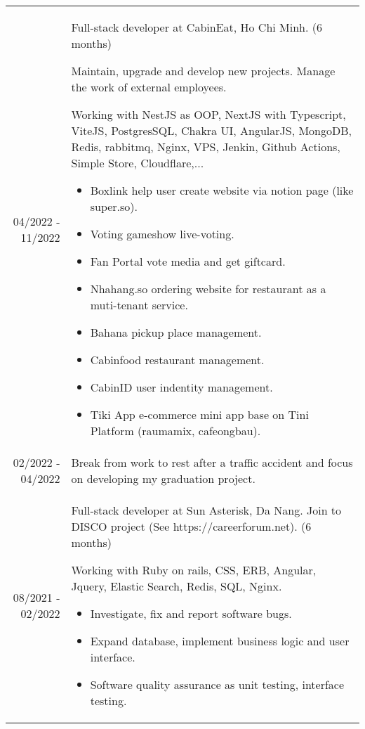 \documentclass[10pt]{article} %
\begin{document}
\begin{tabular}{r|p{}}

  04/2022 - 11/2022            & Full-stack developer at CabinEat, Ho Chi Minh. (6 months)

  Maintain, upgrade and develop new projects. Manage the work of external employees.

  Working with NestJS as OOP, NextJS with Typescript, ViteJS, PostgresSQL, Chakra UI, AngularJS, MongoDB, Redis, rabbitmq, Nginx, VPS, Jenkin, Github Actions, Simple Store, Cloudflare,...
  \begin{itemize}
    \item Boxlink help user create website via notion page (like super.so).
    \item Voting gameshow live-voting.
    \item Fan Portal vote media and get giftcard.
    \item Nhahang.so ordering website for restaurant as a muti-tenant service.
    \item Bahana pickup place management.
    \item Cabinfood restaurant management.
    \item CabinID user indentity management.
    \item Tiki App e-commerce mini app base on Tini Platform (raumamix, cafeongbau).
  \end{itemize} \vspace{0.8em}\\

  02/2022 - 04/2022            & Break from work to rest after a traffic accident and focus on developing my graduation project. \vspace{0.8em}\\

  08/2021 - 02/2022            & Full-stack developer at Sun Asterisk, Da Nang. Join to DISCO project (See https://careerforum.net). (6 months) 

  Working with Ruby on rails, CSS, ERB, Angular, Jquery, Elastic Search, Redis, SQL, Nginx.
  \begin{itemize}
    \item Investigate, fix and report software bugs.
    \item Expand database, implement business logic and user interface.
    \item Software quality assurance as unit testing, interface testing.
  \end{itemize}
  \vspace{0.8em}\\ 
\end{tabular}
\end{document}
